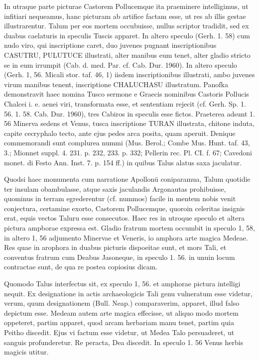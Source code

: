 \documentclass[a4paper, 11pt, oneside, polutonikogreek, german]{article}
\begin{document}
In utraque parte picturae Castorem Pollucemque ita praeminere intelligimus, ut infitiari nequeamus, hanc picturam ab artifice factam esse, ut res ab illis gestae illustrarentur. Talum per eos mortem occubuisse, nullus scriptor tradidit, sed ex duabus caelaturis in speculis Tuscis apparet. In altero speculo (Gerh. 1. 58) cum nudo viro, qui inscriptione caret, duo juvenes pugnant inscriptionibus CASUTRU, PULUTUCE illustrati, alter manibus eum tenet, alter gladio stricto se in eum irrumpit (Cab. d. med. Par. cf. Cab. Dur. 1960). In altero speculo (Gerh. 1, 56. Micali stor. taf. 46, 1) iisdem inscriptionibus illustrati, ambo juvenes virum manibus tenent, inscriptione CHALUCHASU illustratum. Panofka demonstravit haec nomina Tusco sermone e Graecis nominibus Castoris Pollucis Chalcei i. e. aenei viri, transformata esse, et sententiam rejecit (cf. Gerh. Sp. 1. 56. 1. 58. Cab. Dur. 1960), tres Cabiros in speculis esse fictos. Praeterea adsunt 1. 56 Minerva sedens et Venus, tusca inscriptione TURAN illustrata, chitone induta, capite cecryphalo tecto, ante ejus pedes arca posita, quam aperuit. Denique commemorandi sunt complurea nummi (Mus. Berol.; Combe Mus. Hunt. taf. 43, 3.; Mionnet suppl. 4. 231. p. 232, 233. p. 332; Pellerin rec. Pl. CI. f. 67; Cavedoni monet. di Festo Ann. Inst. 7. p. 154 ff.) in quibus Talus alatus saxa jaculatur.

Quodsi haec monumenta cum narratione Apollonü coniparamua, Talum quotidie ter insulam obambulasse, atque saxis jaculandis Argonautas prohibuisse, quominus in terram egrederentur (cf. nummos) facile in mentem nobis venit conjectura, certamine exorto, Castorem Pollucemque, quoroin celeritas insignis erat, equis vectos Taluru esse consecutos. Haec res in utroque speculo et altera pictura ampborae expressa est. Gladio fratrum mortem occumbit in speculo 1, 58, in altero 1, 56 adjumento Minervae et Veneris, io amphora arte magica Medeae. Res quae in arophora in duabus picturis dispoeitae sunt, et mors Tali, et conventus fratrum cum Deabus Jasoneque, in speculo 1. 56. in unuin locum contractae sunt, de qua re postea copiosius dicam.

Quomodo Talus interfectus sit, ex speculo 1, 56. et amphorae pictura intelligi nequit. Ex designatione in actis archaeologicis Tali genu vulneratum esse videtur, verum, quum designationem (Bull. Neap.) comparaverim, apparet, illud falso depictum esse. Medeam autem arte magica effecisse, ut aliquo modo mortem oppeteret, partim apparet, quod arcam herbariam manu tenet, partim quia Peitho discedit. Ejus vi factum esse videtur, ut Medea Talo persuaderet, ut sanguis profunderetur. Re peracta, Dea discedit. In speculo 1. 56 Venus herbis magicis utitur.
\end{document}
